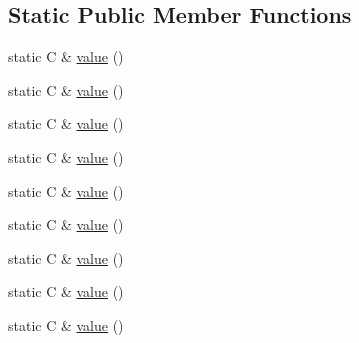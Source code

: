 \subsection*{Static Public Member Functions}
\begin{DoxyCompactItemize}
\item 
static C \& \mbox{\hyperlink{structfakeit_1_1DefaultValue_3_01C_00_01typename_01std_1_1enable__if_3_01is__constructible__typeba4172eb6f54b4f010948e5b77fe8b8f_ae142b421f47b7029f531c0a996e876e7}{value}} ()
\item 
static C \& \mbox{\hyperlink{structfakeit_1_1DefaultValue_3_01C_00_01typename_01std_1_1enable__if_3_01is__constructible__typeba4172eb6f54b4f010948e5b77fe8b8f_ae142b421f47b7029f531c0a996e876e7}{value}} ()
\item 
static C \& \mbox{\hyperlink{structfakeit_1_1DefaultValue_3_01C_00_01typename_01std_1_1enable__if_3_01is__constructible__typeba4172eb6f54b4f010948e5b77fe8b8f_ae142b421f47b7029f531c0a996e876e7}{value}} ()
\item 
static C \& \mbox{\hyperlink{structfakeit_1_1DefaultValue_3_01C_00_01typename_01std_1_1enable__if_3_01is__constructible__typeba4172eb6f54b4f010948e5b77fe8b8f_ae142b421f47b7029f531c0a996e876e7}{value}} ()
\item 
static C \& \mbox{\hyperlink{structfakeit_1_1DefaultValue_3_01C_00_01typename_01std_1_1enable__if_3_01is__constructible__typeba4172eb6f54b4f010948e5b77fe8b8f_ae142b421f47b7029f531c0a996e876e7}{value}} ()
\item 
static C \& \mbox{\hyperlink{structfakeit_1_1DefaultValue_3_01C_00_01typename_01std_1_1enable__if_3_01is__constructible__typeba4172eb6f54b4f010948e5b77fe8b8f_ae142b421f47b7029f531c0a996e876e7}{value}} ()
\item 
static C \& \mbox{\hyperlink{structfakeit_1_1DefaultValue_3_01C_00_01typename_01std_1_1enable__if_3_01is__constructible__typeba4172eb6f54b4f010948e5b77fe8b8f_ae142b421f47b7029f531c0a996e876e7}{value}} ()
\item 
static C \& \mbox{\hyperlink{structfakeit_1_1DefaultValue_3_01C_00_01typename_01std_1_1enable__if_3_01is__constructible__typeba4172eb6f54b4f010948e5b77fe8b8f_ae142b421f47b7029f531c0a996e876e7}{value}} ()
\item 
static C \& \mbox{\hyperlink{structfakeit_1_1DefaultValue_3_01C_00_01typename_01std_1_1enable__if_3_01is__constructible__typeba4172eb6f54b4f010948e5b77fe8b8f_ae142b421f47b7029f531c0a996e876e7}{value}} ()
\end{DoxyCompactItemize}


